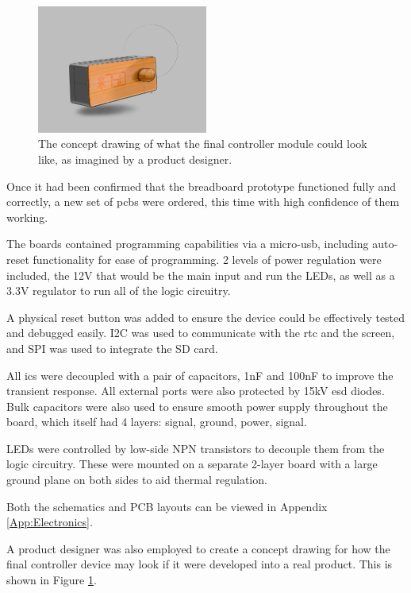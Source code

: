 \begin{figure}[bt]
\centering
\includegraphics[width=0.5\textwidth]{images/Concept.png}
\caption{The concept drawing of what the final controller module could look like, as imagined by a product designer.}
\label{Fig:Concept}
\end{figure}


Once it had been confirmed that the breadboard prototype functioned fully and correctly, a new set of \acrshort{pcbs} were ordered, this time with high confidence of them working. 

The boards contained programming capabilities via a micro-usb, including auto-reset functionality for ease of programming. 2 levels of power regulation were included, the 12V that would be the main input and run the LEDs, as well as a 3.3V regulator to run all of the logic circuitry.

A physical reset button was added to ensure the device could be effectively tested and debugged easily. I2C was used to communicate with the \acrshort{rtc} and the screen, and SPI was used to integrate the SD card.

All \acrshort{ic}s were decoupled with a pair of capacitors, 1nF and 100nF to improve the transient response. All external ports were also protected by 15kV \acrshort{esd} diodes. Bulk capacitors were also used to ensure smooth power supply throughout the board, which itself had 4 layers: signal, ground, power, signal.

LEDs were controlled by low-side NPN transistors to decouple them from the logic circuitry. These were mounted on a separate 2-layer board with a large ground plane on both sides to aid thermal regulation.

Both the schematics and PCB layouts can be viewed in Appendix \ref{App:Electronics}.

A product designer was also employed to create a concept drawing for how the final controller device may look if it were developed into a real product. This is shown in Figure \ref{Fig:Concept}.


